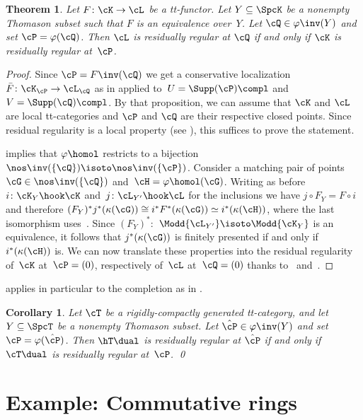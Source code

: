 \documentclass[11pt]{amsart}
\numberwithin{equation}{section} %
\theoremstyle{plain}
\newtheorem{thm}[equation]{Theorem}
\newtheorem{cor}[equation]{Corollary}
\theoremstyle{definition}
\theoremstyle{remark}
\begin{document}
%
\begin{thm}
\label{thm:regularity}%
    Let $F\colon \cK\to \cL$ be a tt-functor. Let $Y\subseteq \SpcK$ be a nonempty Thomason subset such that $F$ is an equivalence over~$Y$. Let $\cQ \in \varphi\inv(Y)$ and set $\cP = \varphi(\cQ)$. Then $\cL$ is residually regular at $\cQ$ if and only if $\cK$ is residually regular at~$\cP$. 
\end{thm}
\begin{proof}
Since $\cP=F\inv(\cQ)$ we get a conservative localization $\bar{F}\colon \cK_{\cP}\to \cL_{\cQ}$ as in  applied to~$U=\Supp(\cP)\compl$ and~$V=\Supp(\cQ)\compl$. By that proposition, we can assume that $\cK$ and $\cL$ are local tt-categories and $\cP$ and $\cQ$ are their respective closed points. Since residual regularity is a local property (see ), this suffices to prove the statement.

 implies that $\varphi\homol$ restricts to a bijection $\nos\inv(\{\cQ\})\isoto \nos\inv(\{\cP\})$. Consider a matching pair of points $\cG\in\nos\inv(\{\cQ\})$ and~$\cH=\varphi\homol(\cG)$. Writing as before $i\colon \cK_Y\hook \cK$ and~$j\colon \cL_{Y'}\hook\cL$ for the inclusions we have $j\circ F_Y=F\circ i$ and therefore $(F_Y)^*j^*(\kappa(\cG))\cong i^*F^*(\kappa(\cG))\simeq i^*(\kappa(\cH))$, where the last isomorphism uses~.
Since $(F_Y)^*\colon$ $\Modd{\cL_{Y'}}\isoto \Modd{\cK_{Y}}$ is an equivalence, it follows that $j^*(\kappa(\cG))$ is finitely presented if and only if $i^*(\kappa(\cH))$ is.
We can now translate these properties into the residual regularity of~$\cK$ at~$\cP=(0)$, respectively of~$\cL$ at~$\cQ=(0)$ thanks to~ and~.
\end{proof}

 applies in particular to the completion as in . 
\begin{cor}
    Let $\cT$ be a rigidly-compactly generated tt-category, and let $Y \subseteq \SpcT$ be a nonempty Thomason subset. Let $\hat{\cP} \in \varphi\inv(Y)$ and set $\cP = \varphi(\hat{\cP})$. Then $\hT\dual$ is residually regular at $\hat{\cP}$ if and only if $\cT\dual$ is residually regular at~$\cP$. 
\qed
\end{cor}

\section{Example: Commutative rings}
\label{sec:commutative-rings}%
\end{document}

